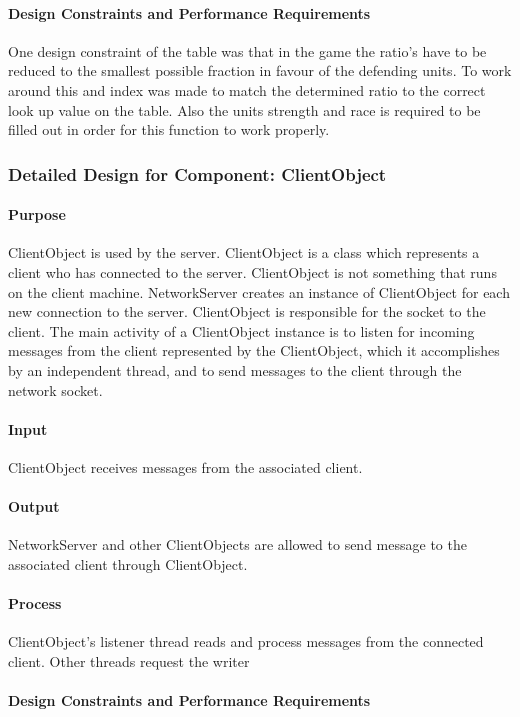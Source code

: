 \documentclass[12pt,a4paper,titlepage]{article}
\begin{document}
\paragraph{Design Constraints and Performance Requirements} One design constraint of the table was that in the game the ratio's have to be reduced to the smallest possible fraction in favour of the defending units. To work around this and index was made to match the determined ratio to the correct look up value on the table. Also the units strength and race is required to be filled out in order for this function to work properly. 

\subsubsection{Detailed Design for Component: ClientObject }
\paragraph{Purpose} ClientObject is used by the server. ClientObject is a class which represents a client who has connected to the server. ClientObject is not something that runs on the client machine. NetworkServer creates an instance of ClientObject for each new connection to the server. ClientObject is responsible for the socket to the client. The main activity of a ClientObject instance is to listen for incoming messages from the client represented by the ClientObject, which it accomplishes by an independent thread, and to send messages to the client through the network socket.
\paragraph{Input} ClientObject receives messages from the associated client. 
\paragraph{Output} NetworkServer and other ClientObjects are allowed
to send message to the associated client through ClientObject.
\paragraph{Process} ClientObject's listener thread reads and process messages from the connected client. Other threads request the writer
\paragraph{Design Constraints and Performance Requirements}
\end{document}
